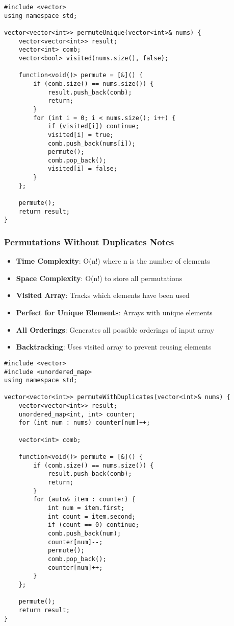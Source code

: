 \documentclass[11pt,a4paper]{article}
\begin{document}
\begin{lstlisting}[caption={Permutations Without Duplicates}]
#include <vector>
using namespace std;

vector<vector<int>> permuteUnique(vector<int>& nums) {
    vector<vector<int>> result;
    vector<int> comb;
    vector<bool> visited(nums.size(), false);

    function<void()> permute = [&]() {
        if (comb.size() == nums.size()) {
            result.push_back(comb);
            return;
        }
        for (int i = 0; i < nums.size(); i++) {
            if (visited[i]) continue;
            visited[i] = true;
            comb.push_back(nums[i]);
            permute();
            comb.pop_back();
            visited[i] = false;
        }
    };

    permute();
    return result;
}
\end{lstlisting}

\subsubsection*{Permutations Without Duplicates Notes}
\begin{itemize}
\item \textbf{Time Complexity}: O(n!) where n is the number of elements
\item \textbf{Space Complexity}: O(n!) to store all permutations
\item \textbf{Visited Array}: Tracks which elements have been used
\item \textbf{Perfect for Unique Elements}: Arrays with unique elements
\item \textbf{All Orderings}: Generates all possible orderings of input array
\item \textbf{Backtracking}: Uses visited array to prevent reusing elements
\end{itemize}

\newpage
\begin{lstlisting}[caption={Permutations With Duplicates}]
#include <vector>
#include <unordered_map>
using namespace std;

vector<vector<int>> permuteWithDuplicates(vector<int>& nums) {
    vector<vector<int>> result;
    unordered_map<int, int> counter;
    for (int num : nums) counter[num]++;

    vector<int> comb;

    function<void()> permute = [&]() {
        if (comb.size() == nums.size()) {
            result.push_back(comb);
            return;
        }
        for (auto& item : counter) {
            int num = item.first;
            int count = item.second;
            if (count == 0) continue;
            comb.push_back(num);
            counter[num]--;
            permute();
            comb.pop_back();
            counter[num]++;
        }
    };

    permute();
    return result;
}
\end{lstlisting}
\end{document}
